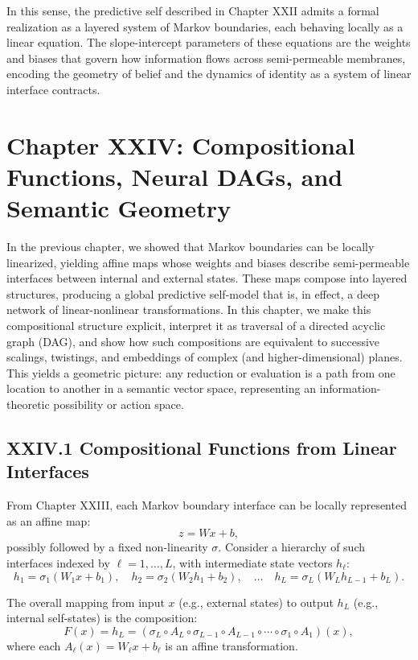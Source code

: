 \documentclass[11pt,letterpaper]{article}
\begin{document}
In this sense, the predictive self described in Chapter XXII admits a formal realization as a layered system of Markov boundaries, each behaving locally as a linear equation. The slope-intercept parameters of these equations are the weights and biases that govern how information flows across semi-permeable membranes, encoding the geometry of belief and the dynamics of identity as a system of linear interface contracts.

\newpage
\section{Chapter XXIV: Compositional Functions, Neural DAGs, and Semantic Geometry}

In the previous chapter, we showed that Markov boundaries can be locally linearized, yielding affine maps whose weights and biases describe semi-permeable interfaces between internal and external states. These maps compose into layered structures, producing a global predictive self-model that is, in effect, a deep network of linear-nonlinear transformations. In this chapter, we make this compositional structure explicit, interpret it as traversal of a directed acyclic graph (DAG), and show how such compositions are equivalent to successive scalings, twistings, and embeddings of complex (and higher-dimensional) planes. This yields a geometric picture: any reduction or evaluation is a path from one location to another in a semantic vector space, representing an information-theoretic possibility or action space.

\subsection{XXIV.1 Compositional Functions from Linear Interfaces}

From Chapter XXIII, each Markov boundary interface can be locally represented as an affine map:
\[
z = W x + b,
\]
possibly followed by a fixed non-linearity $\sigma$. Consider a hierarchy of such interfaces indexed by $\ell = 1, \dots, L$, with intermediate state vectors $h_\ell$:
\[
h_1 = \sigma_1(W_1 x + b_1), \quad
h_2 = \sigma_2(W_2 h_1 + b_2), \quad \dots \quad
h_L = \sigma_L(W_L h_{L-1} + b_L).
\]

The overall mapping from input $x$ (e.g., external states) to output $h_L$ (e.g., internal self-states) is the composition:
\[
F(x) = h_L = (\sigma_L \circ A_L \circ \sigma_{L-1} \circ A_{L-1} \circ \cdots \circ \sigma_1 \circ A_1)(x),
\]
where each $A_\ell(x) = W_\ell x + b_\ell$ is an affine transformation.
\end{document}
